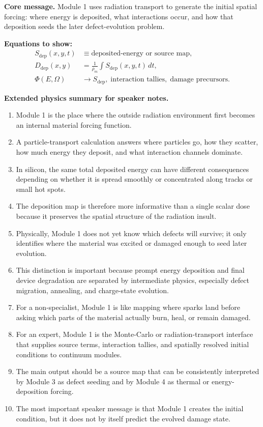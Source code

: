 \documentclass[11pt]{article}
\begin{document}
\textbf{Core message.} Module 1 uses radiation transport to generate the initial spatial forcing: where energy is deposited, what interactions occur, and how that deposition seeds the later defect-evolution problem.

\textbf{Equations to show:}
\begin{align*}
S_{\mathrm{dep}}(x,y,t) &\equiv \text{deposited-energy or source map},\\
D_{\mathrm{dep}}(x,y) &= \frac{1}{\rho_m}\int S_{\mathrm{dep}}(x,y,t)\,dt,\\
\Phi(E,\Omega) &\longrightarrow S_{\mathrm{dep}},\; \text{interaction tallies},\; \text{damage precursors}.
\end{align*}

\textbf{Extended physics summary for speaker notes.}
\begin{enumerate}[leftmargin=1.6em]
    \item Module 1 is the place where the outside radiation environment first becomes an internal material forcing function.
    \item A particle-transport calculation answers where particles go, how they scatter, how much energy they deposit, and what interaction channels dominate.
    \item In silicon, the same total deposited energy can have different consequences depending on whether it is spread smoothly or concentrated along tracks or small hot spots.
    \item The deposition map is therefore more informative than a single scalar dose because it preserves the spatial structure of the radiation insult.
    \item Physically, Module 1 does not yet know which defects will survive; it only identifies where the material was excited or damaged enough to seed later evolution.
    \item This distinction is important because prompt energy deposition and final device degradation are separated by intermediate physics, especially defect migration, annealing, and charge-state evolution.
    \item For a non-specialist, Module 1 is like mapping where sparks land before asking which parts of the material actually burn, heal, or remain damaged.
    \item For an expert, Module 1 is the Monte-Carlo or radiation-transport interface that supplies source terms, interaction tallies, and spatially resolved initial conditions to continuum modules.
    \item The main output should be a source map that can be consistently interpreted by Module 3 as defect seeding and by Module 4 as thermal or energy-deposition forcing.
    \item The most important speaker message is that Module 1 creates the initial condition, but it does not by itself predict the evolved damage state.
\end{enumerate}
\end{document}
